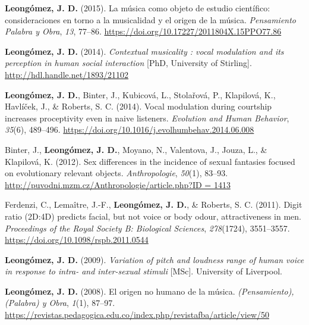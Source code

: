 \documentclass[11pt, a4paper]{awesome-cv}
\begin{document}
\leavevmode{}%
\textbf{Leongómez, J. D.} (2015). {La m{ú}sica como objeto de estudio
cient{í}fico: consideraciones en torno a la musicalidad y el origen de
la m{ú}sica}. \emph{Pensamiento Palabra y Obra}, \emph{13}, 77--86.
\url{https://doi.org/10.17227/2011804X.15PPO77.86}

\leavevmode{}%
\textbf{Leongómez, J. D.} (2014). \emph{{Contextual musicality : vocal
modulation and its perception in human social interaction}} {[}PhD,
University of Stirling{]}. \url{http://hdl.handle.net/1893/21102}

\leavevmode{}%
\textbf{Leongómez, J. D.}, Binter, J., Kubicová, L., Stolařová, P.,
Klapilová, K., Havlíček, J., \& Roberts, S. C. (2014). {Vocal modulation
during courtship increases proceptivity even in naive listeners}.
\emph{Evolution and Human Behavior}, \emph{35}(6), 489--496.
\url{https://doi.org/10.1016/j.evolhumbehav.2014.06.008}

\leavevmode{}%
Binter, J., \textbf{Leongómez, J. D.}, Moyano, N., Valentova, J., Jouza,
L., \& Klapilová, K. (2012). {Sex differences in the incidence of sexual
fantasies focused on evolutionary relevant objects.}
\emph{Anthropologie}, \emph{50}(1), 83--93.
\href{http://puvodni.mzm.cz/Anthropologie/article.php?ID\%20=\%201413}{http://puvodni.mzm.cz/Anthropologie/article.php?ID
= 1413}

\leavevmode{}%
Ferdenzi, C., Lemaître, J.-F., \textbf{Leongómez, J. D.}, \& Roberts, S.
C. (2011). {Digit ratio (2D:4D) predicts facial, but not voice or body
odour, attractiveness in men.} \emph{Proceedings of the Royal Society B:
Biological Sciences}, \emph{278}(1724), 3551--3557.
\url{https://doi.org/10.1098/rspb.2011.0544}

\leavevmode{}%
\textbf{Leongómez, J. D.} (2009). \emph{{Variation of pitch and loudness
range of human voice in response to intra- and inter-sexual stimuli}}
{[}MSc{]}. University of Liverpool.

\leavevmode{}%
\textbf{Leongómez, J. D.} (2008). {El origen no humano de la m{ú}sica}.
\emph{(Pensamiento), (Palabra) y Obra}, \emph{1}(1), 87--97.
\url{https://revistas.pedagogica.edu.co/index.php/revistafba/article/view/50}

\endgroup
\end{document}
